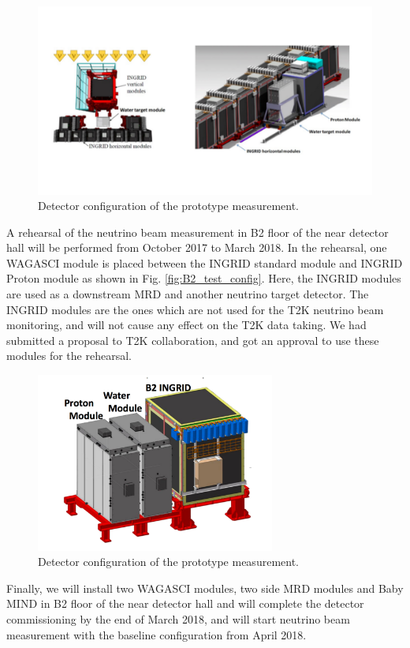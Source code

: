 \begin{figure}%
  \begin{center}
  \includegraphics[width=1.0\textwidth]{figs/SS_config.pdf}
  \caption{Detector configuration of the prototype measurement.}
  \label{fig:SS_config}
  \end{center}
\end{figure}


A rehearsal of the neutrino beam measurement in B2 floor of the near detector hall
will be performed  from October 2017 to March 2018.
In the rehearsal, one WAGASCI module is placed between the INGRID standard module and INGRID Proton module as shown in Fig. \ref{fig:B2_test_config}.
Here, the INGRID modules are used as a downstream MRD and another neutrino target detector.
The INGRID modules are the ones which are not used for the T2K neutrino beam monitoring,
and will not cause any effect on the T2K data taking.
We had submitted a proposal to T2K collaboration, and got an approval to use these modules for the rehearsal.

\begin{figure}%
  \begin{center}
  \includegraphics[width=0.7\textwidth]{figs/B2_test_config.pdf}
  \caption{Detector configuration of the prototype measurement.}
  \label{fig:B2_tes_config}
  \end{center}
\end{figure}

Finally, we will install two WAGASCI modules, two side MRD modules and Baby MIND in B2 floor of the near detector hall and will complete the detector commissioning by the end of March 2018, and will start neutrino beam measurement with the baseline configuration from April 2018.
